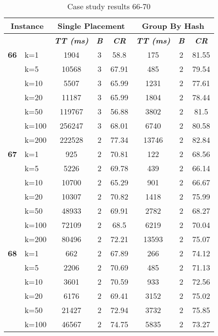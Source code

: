     \begin{table}[htbp]
    \caption{Case study results 66-70}
    \centering
    \begin{tabular}{|l|l|c|c|c|c|c|c|}
    \hline
    \multicolumn{ 2}{|c|}{\textbf{Instance}} & \multicolumn{ 3}{c|}{\textbf{Single Placement}} & \multicolumn{ 3}{c|}{\textbf{Group By Hash}} \\ \hline
    \multicolumn{ 2}{|l|}{} & \textbf{\textit{TT (ms)}} & \textbf{\textit{B}} & \textbf{\textit{CR}} & \textbf{\textit{TT (ms)}} & \textbf{\textit{B}} & \textbf{\textit{CR}} \\ \hline
    \multicolumn{1}{|r|}{\textbf{66}} & k=1 & 1904 & 3 & 58.8 & 175 & 2 & 81.55 \\ 
     & k=5 & 10568 & 3 & 67.91 & 485 & 2 & 79.54 \\ 
     & k=10 & 5507 & 3 & 65.99 & 1231 & 2 & 77.61 \\ 
     & k=20 & 11187 & 3 & 65.99 & 1804 & 2 & 78.44 \\ 
     & k=50 & 119767 & 3 & 56.88 & 3802 & 2 & 81.5 \\ 
     & k=100 & 256247 & 3 & 68.01 & 6740 & 2 & 80.58 \\ 
     & k=200 & 222528 & 2 & 77.34 & 13746 & 2 & 82.84 \\ \hline
    \multicolumn{1}{|r|}{\textbf{67}} & k=1 & 925 & 2 & 70.81 & 122 & 2 & 68.56 \\ 
     & k=5 & 5226 & 2 & 69.78 & 439 & 2 & 66.14 \\ 
     & k=10 & 10700 & 2 & 65.29 & 901 & 2 & 66.67 \\ 
     & k=20 & 10307 & 2 & 70.82 & 1418 & 2 & 75.99 \\ 
     & k=50 & 48933 & 2 & 69.91 & 2782 & 2 & 68.27 \\ 
     & k=100 & 72109 & 2 & 68.5 & 6219 & 2 & 70.04 \\ 
     & k=200 & 80496 & 2 & 72.21 & 13593 & 2 & 75.07 \\ \hline
    \multicolumn{1}{|r|}{\textbf{68}} & k=1 & 662 & 2 & 67.89 & 266 & 2 & 74.12 \\ 
     & k=5 & 2206 & 2 & 70.69 & 485 & 2 & 71.13 \\ 
     & k=10 & 3601 & 2 & 70.59 & 933 & 2 & 72.56 \\ 
     & k=20 & 6176 & 2 & 69.41 & 3152 & 2 & 75.02 \\ 
     & k=50 & 21427 & 2 & 72.94 & 3732 & 2 & 75.85 \\ 
     & k=100 & 46567 & 2 & 74.75 & 5835 & 2 & 73.27 \\ 

\end{tabular}
\end{table}
